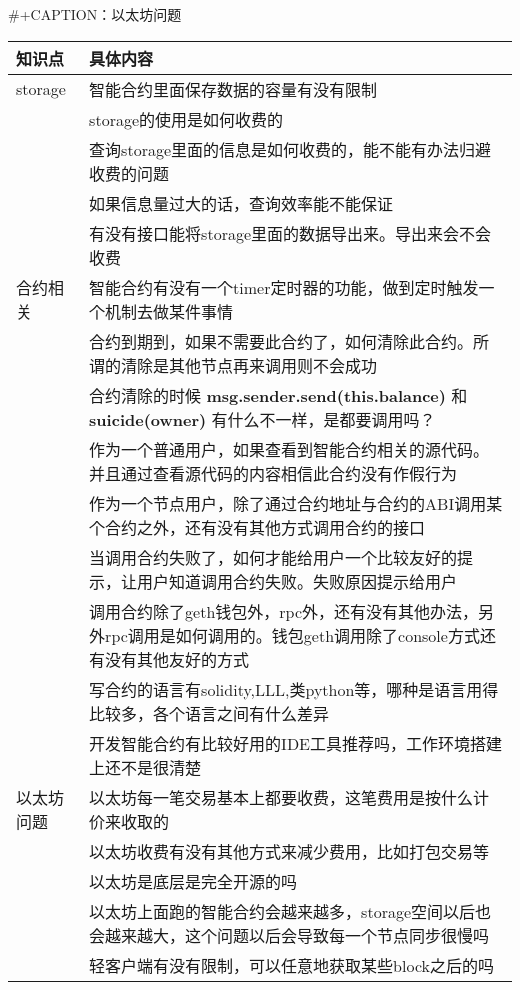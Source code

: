 \documentclass[11pt]{article}
\begin{document}
\#+CAPTION：以太坊问题
\begin{center}
\begin{tabular}{ll}
知识点 & 具体内容\\
\hline
storage & 智能合约里面保存数据的容量有没有限制\\
 & storage的使用是如何收费的\\
 & 查询storage里面的信息是如何收费的，能不能有办法归避收费的问题\\
 & 如果信息量过大的话，查询效率能不能保证\\
 & 有没有接口能将storage里面的数据导出来。导出来会不会收费\\
\hline
合约相关 & 智能合约有没有一个timer定时器的功能，做到定时触发一个机制去做某件事情\\
 & 合约到期到，如果不需要此合约了，如何清除此合约。所谓的清除是其他节点再来调用则不会成功\\
 & 合约清除的时候 \textbf{msg.sender.send(this.balance)} 和 \textbf{suicide(owner)} 有什么不一样，是都要调用吗？\\
 & 作为一个普通用户，如果查看到智能合约相关的源代码。并且通过查看源代码的内容相信此合约没有作假行为\\
 & 作为一个节点用户，除了通过合约地址与合约的ABI调用某个合约之外，还有没有其他方式调用合约的接口\\
 & 当调用合约失败了，如何才能给用户一个比较友好的提示，让用户知道调用合约失败。失败原因提示给用户\\
 & 调用合约除了geth钱包外，rpc外，还有没有其他办法，另外rpc调用是如何调用的。钱包geth调用除了console方式还有没有其他友好的方式\\
 & 写合约的语言有solidity,LLL,类python等，哪种是语言用得比较多，各个语言之间有什么差异\\
 & 开发智能合约有比较好用的IDE工具推荐吗，工作环境搭建上还不是很清楚\\
\hline
以太坊问题 & 以太坊每一笔交易基本上都要收费，这笔费用是按什么计价来收取的\\
 & 以太坊收费有没有其他方式来减少费用，比如打包交易等\\
 & 以太坊是底层是完全开源的吗\\
 & 以太坊上面跑的智能合约会越来越多，storage空间以后也会越来越大，这个问题以后会导致每一个节点同步很慢吗\\
 & 轻客户端有没有限制，可以任意地获取某些block之后的吗\\
\end{tabular}
\end{center}
\end{document}
